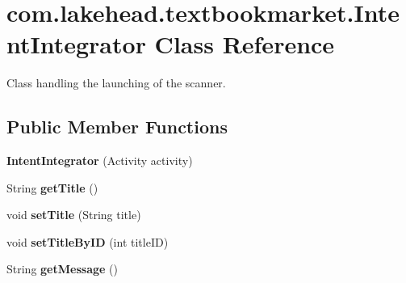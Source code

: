 \hypertarget{classcom_1_1lakehead_1_1textbookmarket_1_1_intent_integrator}{\section{com.\-lakehead.\-textbookmarket.\-Intent\-Integrator Class Reference}
\label{classcom_1_1lakehead_1_1textbookmarket_1_1_intent_integrator}
}


Class handling the launching of the scanner.  


\subsection*{Public Member Functions}
\begin{DoxyCompactItemize}
\item 
\hypertarget{classcom_1_1lakehead_1_1textbookmarket_1_1_intent_integrator_a4cdf34ae9ee95f1aeff6c3215d75d697}{{\bfseries Intent\-Integrator} (Activity activity)}\label{classcom_1_1lakehead_1_1textbookmarket_1_1_intent_integrator_a4cdf34ae9ee95f1aeff6c3215d75d697}

\item 
\hypertarget{classcom_1_1lakehead_1_1textbookmarket_1_1_intent_integrator_a77646022adec55179094771213cfa888}{String {\bfseries get\-Title} ()}\label{classcom_1_1lakehead_1_1textbookmarket_1_1_intent_integrator_a77646022adec55179094771213cfa888}

\item 
\hypertarget{classcom_1_1lakehead_1_1textbookmarket_1_1_intent_integrator_af97ac93d1ead13b44888ca7d0b0dc9f5}{void {\bfseries set\-Title} (String title)}\label{classcom_1_1lakehead_1_1textbookmarket_1_1_intent_integrator_af97ac93d1ead13b44888ca7d0b0dc9f5}

\item 
\hypertarget{classcom_1_1lakehead_1_1textbookmarket_1_1_intent_integrator_ad282827648640c690c5d8486bc04dd2f}{void {\bfseries set\-Title\-By\-I\-D} (int title\-I\-D)}\label{classcom_1_1lakehead_1_1textbookmarket_1_1_intent_integrator_ad282827648640c690c5d8486bc04dd2f}

\item 
\hypertarget{classcom_1_1lakehead_1_1textbookmarket_1_1_intent_integrator_abba5e384dd0627c0b9b74a44277a7091}{String {\bfseries get\-Message} ()}\label{classcom_1_1lakehead_1_1textbookmarket_1_1_intent_integrator_abba5e384dd0627c0b9b74a44277a7091}


\end{DoxyCompactItemize}
